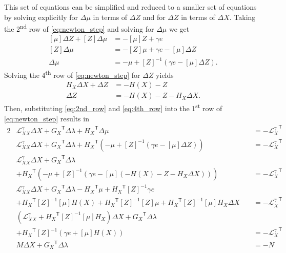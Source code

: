 \documentclass[12pt]{article}
\newcommand{\trans}[1]{{#1}^{\ensuremath{\mathsf{T}}}}  %
\newcommand{\diag}[1]{\left[{#1}\right]}                %
\numberwithin{equation}{section}
\numberwithin{table}{section}
\numberwithin{figure}{section}
\begin{document}
This set of equations can be simplified and reduced to a smaller set of equations by solving explicitly for $\Delta \mu$ in terms of $\Delta Z$ and for $\Delta Z$ in terms of $\Delta X$. Taking the 2\textsuperscript{nd} row of \eqref{eq:newton_step} and solving for $\Delta \mu$ we get
\begin{align}
\diag{\mu} \Delta Z + \diag{Z} \Delta \mu &= -\diag{\mu} Z + \gamma e \nonumber \\
\diag{Z} \Delta \mu &= -\diag{Z} \mu + \gamma e - \diag{\mu} \Delta Z \nonumber \\
\Delta \mu &= - \mu + \diag{Z}^{-1} (\gamma e - \diag{\mu} \Delta Z).
\label{eq:2nd_row}
\end{align}
Solving the 4\textsuperscript{th} row of \eqref{eq:newton_step} for $\Delta Z$ yields
\begin{align}
H_X \Delta X + \Delta Z &= -H(X) - Z \nonumber \\
\Delta Z &= -H(X) - Z - H_X \Delta X.
\label{eq:4th_row}
\end{align}
Then, substituting \eqref{eq:2nd_row} and \eqref{eq:4th_row} into the 1\textsuperscript{st} row of \eqref{eq:newton_step} results in
\begin{alignat}{2}
&\mathcal{L}^\gamma_{XX} \Delta X + \trans{G_X} \Delta \lambda + \trans{H_X} \Delta \mu &&\;= -\trans{\mathcal{L}^\gamma_X} \nonumber \\
&\mathcal{L}^\gamma_{XX} \Delta X + \trans{G_X} \Delta \lambda + \trans{H_X} (- \mu + \diag{Z}^{-1} (\gamma e - \diag{\mu} \Delta Z)) &&\;= -\trans{\mathcal{L}^\gamma_X} \nonumber \\
&\mathcal{L}^\gamma_{XX} \Delta X + \trans{G_X} \Delta \lambda & \nonumber \\
&+ \trans{H_X} (- \mu + \diag{Z}^{-1} (\gamma e - \diag{\mu} (-H(X) - Z - H_X \Delta X))) &&\;= -\trans{\mathcal{L}^\gamma_X} \nonumber \\
&\mathcal{L}^\gamma_{XX} \Delta X + \trans{G_X} \Delta \lambda - \trans{H_X} \mu + \trans{H_X} \diag{Z}^{-1} \gamma e & \nonumber \\
&+ \trans{H_X} \diag{Z}^{-1} \diag{\mu} H(X) + \trans{H_X} \diag{Z}^{-1} \diag{Z} \mu + \trans{H_X} \diag{Z}^{-1} \diag{\mu} H_X \Delta X &&\;= -\trans{\mathcal{L}^\gamma_X} \nonumber \\
&(\mathcal{L}^\gamma_{XX} + \trans{H_X} \diag{Z}^{-1} \diag{\mu} H_X) \Delta X + \trans{G_X} \Delta \lambda  & \nonumber \\
&+ \trans{H_X} \diag{Z}^{-1} (\gamma e + \diag{\mu} H(X)) &&\;= -\trans{\mathcal{L}^\gamma_X} \nonumber \\
&M \Delta X + \trans{G_X} \Delta \lambda &&\;= -N
\label{eq:1st_row}
\end{alignat}
\end{document}
